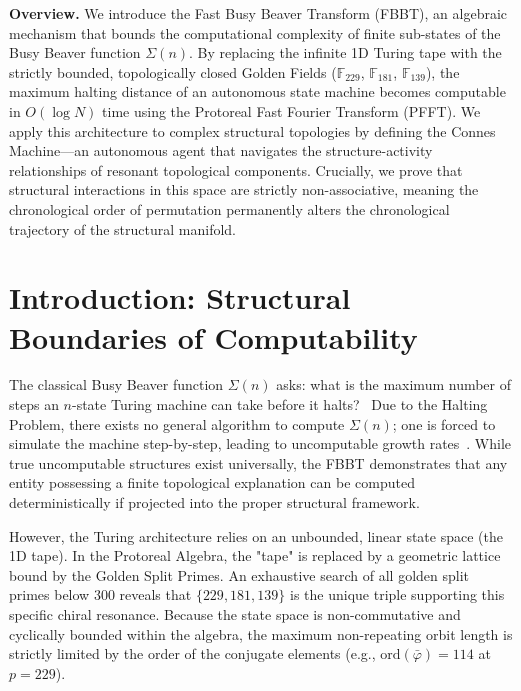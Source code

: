 



\vspace{1em}\noindent\textbf{Overview.}
We introduce the Fast Busy Beaver Transform (FBBT), an algebraic mechanism that bounds the computational complexity of finite sub-states of the Busy Beaver function $\Sigma(n)$. By replacing the infinite 1D Turing tape with the strictly bounded, topologically closed Golden Fields ($\mathbb{F}_{229}$, $\mathbb{F}_{181}$, $\mathbb{F}_{139}$), the maximum halting distance of an autonomous state machine becomes computable in $O(\log N)$ time using the Protoreal Fast Fourier Transform (PFFT). We apply this architecture to complex structural topologies by defining the Connes Machine---an autonomous agent that navigates the structure-activity relationships of resonant topological components. Crucially, we prove that structural interactions in this space are strictly non-associative, meaning the chronological order of permutation permanently alters the chronological trajectory of the structural manifold.
\vspace{1em}


\section{Introduction: Structural Boundaries of Computability}

The classical Busy Beaver function $\Sigma(n)$ asks: what is the maximum number of steps an $n$-state Turing machine can take before it halts?~\cite{rado1962, linrado1965} Due to the Halting Problem, there exists no general algorithm to compute $\Sigma(n)$; one is forced to simulate the machine step-by-step, leading to uncomputable growth rates~\cite{aaronson2020}. While true uncomputable structures exist universally, the FBBT demonstrates that any entity possessing a finite topological explanation can be computed deterministically if projected into the proper structural framework.

However, the Turing architecture relies on an unbounded, linear state space (the 1D tape). In the Protoreal Algebra, the "tape" is replaced by a geometric lattice bound by the Golden Split Primes. An exhaustive search of all golden split primes below 300 reveals that $\{229, 181, 139\}$ is the unique triple supporting this specific chiral resonance. Because the state space is non-commutative and cyclically bounded within the algebra, the maximum non-repeating orbit length is strictly limited by the order of the conjugate elements (e.g., $\text{ord}(\bar{\varphi}) = 114$ at $p=229$).

